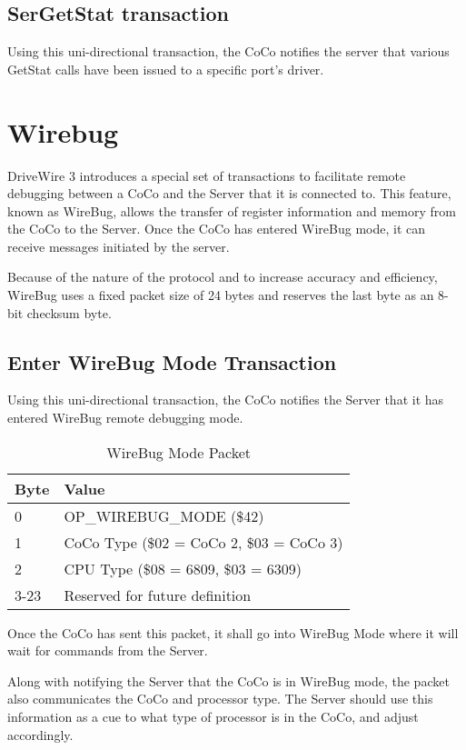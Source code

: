 \documentclass{article}
\begin{document}
\subsection{SerGetStat transaction}
Using this uni-directional transaction, the CoCo notifies the server that various GetStat calls have been issued to a specific port's driver.


\section{Wirebug}
DriveWire 3 introduces a special set of transactions to facilitate remote debugging between a CoCo and the Server that it is connected to. This feature, known as WireBug, allows the transfer of register information and memory from the CoCo to the Server.	Once the CoCo has entered WireBug mode, it can receive messages initiated by the server.

Because of the nature of the protocol and to increase accuracy and efficiency, WireBug uses a fixed packet size of 24 bytes and reserves the last byte as an 8- bit checksum byte.

\subsection{Enter WireBug Mode Transaction}
Using this uni-directional transaction, the CoCo notifies the Server that it has entered WireBug remote debugging mode.

\begin{table}[ht]
\caption{WireBug Mode Packet}
\begin{center}
\begin{tabular}{|ll|}
\hline
Byte & Value \\ \hline
0 & OP\_WIREBUG\_MODE (\$42) \\
1 & CoCo Type (\$02 = CoCo 2, \$03 = CoCo 3) \\
2 & CPU Type (\$08 = 6809, \$03 = 6309) \\
3-23 & Reserved for future definition \\
\hline
\end{tabular}
\end{center}
\end{table}

Once the CoCo has sent this packet, it shall go into WireBug Mode where it will wait for commands from the Server.

Along with notifying the Server that the CoCo is in WireBug mode, the packet also communicates the CoCo and processor type.	The Server should use this information as a cue to what type of processor is in the CoCo, and adjust accordingly.
\end{document}
